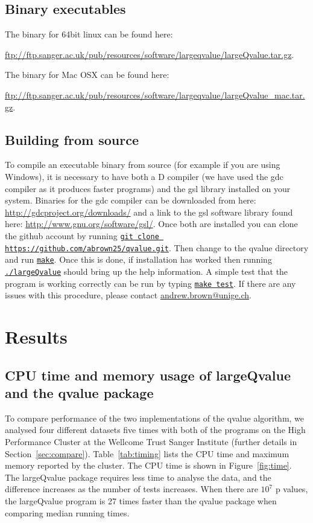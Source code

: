 \documentclass{amsart}
\begin{document}
\subsection{Binary executables}

The binary for 64bit linux can be found here:

\noindent \url{ftp://ftp.sanger.ac.uk/pub/resources/software/largeqvalue/largeQvalue.tar.gz}.

\noindent The binary for Mac OSX can be found here:

\noindent \url{ftp://ftp.sanger.ac.uk/pub/resources/software/largeqvalue/largeQvalue_mac.tar.gz}.

\subsection{Building from source}

To compile an executable binary from source (for example if you are using Windows), it is necessary to have both a D compiler (we have used the gdc compiler as it produces faster programs) and the gsl library installed on your system. Binaries for the gdc compiler can be downloaded from here: \url{http://gdcproject.org/downloads/} and a link to the gsl software library found here: \url{http://www.gnu.org/software/gsl/}. Once both are installed you can clone the github account by running \underline{\texttt{git clone https://github.com/abrown25/qvalue.git}}. Then change to the qvalue directory and run \underline{\texttt{make}}. Once this is done, if installation has worked then running \underline{\texttt{./largeQvalue}} should bring up the help information. A simple test that the program is working correctly can be run by typing \underline{\texttt{make test}}. If there are any issues with this procedure, please contact \href{mailto:andrew.brown@unige.ch}{andrew.brown@unige.ch}.

\section{Results}


\subsection{CPU time and memory usage of largeQvalue and the qvalue package}

\noindent To compare performance of the two implementations of the qvalue algorithm, we analysed four different datasets five times with both of the programs on the High Performance Cluster at the Wellcome Trust Sanger Institute (further details in Section~\ref{sec:compare}). Table~\ref{tab:timing} lists the CPU time and maximum memory reported by the cluster. The CPU time is shown in Figure~\ref{fig:time}. The largeQvalue package requires less time to analyse the data, and the difference increases as the number of tests increases. When there are $10^7$ p values, the largeQvalue program is 27 times faster than the qvalue package when comparing median running times.
\end{document}
